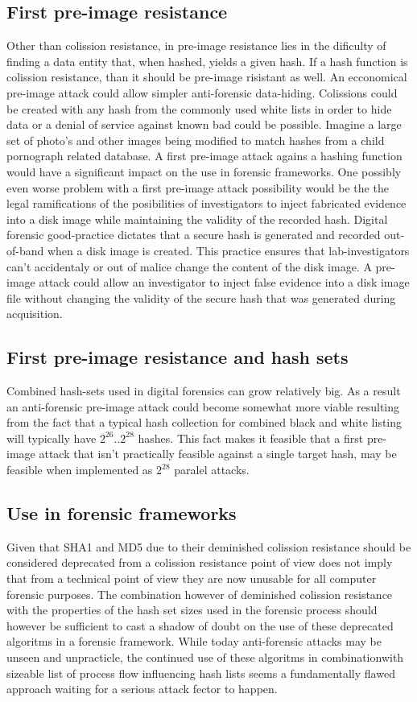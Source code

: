 \subsection{First pre-image resistance}
Other than colission resistance, in pre-image resistance lies in the dificulty of finding a data entity that, when hashed, yields a given hash. If a hash function is colission resistance, than it should be pre-image risistant as well. An ecconomical pre-image attack could allow simpler anti-forensic data-hiding. Colissions could be created with any hash from the commonly used white lists in order to hide data or a denial of service against known bad could be possible. Imagine a large set of photo's and other images being modified to match hashes from a child pornograph related database. A first pre-image attack agains a hashing function would have a significant impact on the use in forensic frameworks. One possibly even worse problem with a first pre-image attack possibility would be the the legal ramifications of the posibilities of investigators to inject fabricated evidence into a disk image while maintaining the validity of the recorded hash. Digital forensic good-practice dictates that a secure hash is generated and recorded out-of-band when a disk image is created. This practice ensures that lab-investigators can't accidentaly or out of malice change the content of the disk image. A pre-image attack could allow an investigator to inject false evidence into a disk image file without changing the validity of the secure hash that was generated during acquisition. 
\subsection{First pre-image resistance and hash sets}
Combined hash-sets used in digital forensics can grow relatively big. As a result an anti-forensic pre-image attack could become somewhat more viable resulting from the fact that a typical hash collection for combined black and white listing will typically have \(2^{26} .. 2^{28} \) hashes. This fact makes it feasible that a first pre-image attack that isn't practically feasible against a single target hash, may be feasible when implemented as \(2^{28}\) paralel attacks. 
\subsection{Use in forensic frameworks}
Given that SHA1 and MD5 due to their deminished colission resistance should be considered deprecated from a colission resistance point of view does not imply that from a technical point of view they are now unusable for all computer forensic purposes. The combination however of deminished colission resistance with the properties of the hash set sizes used in the forensic process should however be sufficient to cast a shadow of doubt on the use of these deprecated algoritms in a forensic framework. While today anti-forensic attacks may be unseen and unpracticle, the continued use of these algoritms in combinationwith sizeable list of process flow influencing hash lists seems a fundamentally flawed approach waiting for a serious attack fector to happen.
